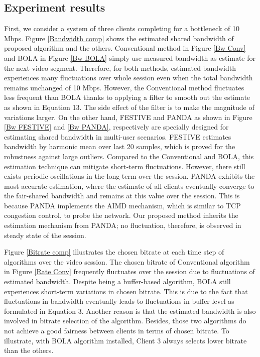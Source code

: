 \documentclass[journal]{IEEEtran}
\begin{document}
\subsection{Experiment results}
First, we consider a system of three clients completing for a bottleneck of 10 Mbps. Figure \ref{Bandwidth comp} shows the estimated shared bandwidth of proposed algorithm and the others. Conventional method in Figure \ref{Bw Conv} and BOLA in Figure \ref{Bw BOLA} simply use measured bandwidth as estimate for the next video segment. Therefore, for both methods, estimated bandwidth experiences many fluctuations over whole session even when the total bandwidth remains unchanged of 10 Mbps. However, the Conventional method fluctuates less frequent than BOLA thanks to applying a filter to smooth out the estimate as shown in Equation 13. The side effect of the filter is to make the magnitude of variations larger. On the other hand, FESTIVE and PANDA as shown in Figure \ref{Bw FESTIVE} and \ref{Bw PANDA}, respectively are specially designed for estimating shared bandwidth in multi-user scenarios. FESTIVE estimates bandwidth by harmonic mean over last 20 samples, which is proved for the robustness against large outliers. Compared to the Conventional and BOLA, this estimation technique can mitigate short-term fluctuations. However, there still exists periodic oscillations in the long term over the session. PANDA exhibits the most accurate estimation, where the estimate of all clients eventually converge to the fair-shared bandwidth and remains at this value over the session. This is because PANDA implements the AIMD mechanism, which is similar to TCP congestion control, to probe the network. Our proposed method inherits the estimation mechanism from PANDA; no fluctuation, therefore, is observed in steady state of the session.
\par Figure \ref{Bitrate comp} illustrates the chosen bitrate at each time step of algorithms over the video session. The chosen bitrate of Conventional algorithm in Figure \ref{Rate Conv} frequently fluctuates over the session due to fluctuations of estimated bandwidth. Despite being a buffer-based algorithm, BOLA still experiences short-term variations in chosen bitrate. This is due to the fact that fluctuations in bandwidth eventually leads to fluctuations in buffer level as formulated in Equation 3.  Another reason is that the estimated bandwidth is also involved in bitrate selection of the algorithm. Besides, those two algorithms do not achieve a good fairness between clients in terms of chosen bitrate. To illustrate, with BOLA algorithm installed, Client 3 always selects lower bitrate than the others. 
\end{document}
